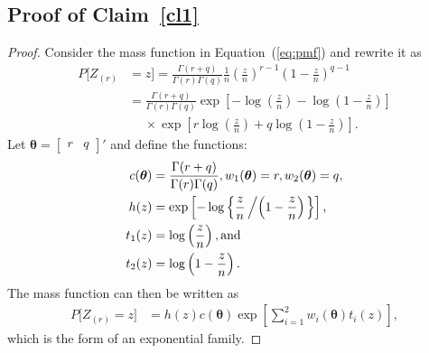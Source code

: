 \documentclass[12pt]{article}
\theoremstyle{plain}
\newcommand{\btheta}{\boldsymbol{\theta}}
\begin{document}
\begin{appendix}
\section{Proof of Claim~\ref{cl1}}\label{appB}


\begin{proof}
Consider the mass function in Equation~(\ref{eq:pmf}) and rewrite it as
\begin{align*}
	P\bigg[ Z_{(r)} &= z \bigg]  =\frac{\Gamma(r+q)}{\Gamma(r)\Gamma(q)}  \frac{1}{n} \left(\frac{z}{n}\right)^{r-1}\left(1-\frac{z}{n}\right)^{q-1} \\
	&= \frac{\Gamma(r+q)}{\Gamma(r)\Gamma(q)}\exp\left[ - \log\left( \frac{z}{n} \right) - \log\left(1-\frac{z}{n}\right)  \right]\\
	&\hspace{15pt}\times \exp\left[ r\log\left( \frac{z}{n} \right) + q\log\left(1-\frac{z}{n}\right) \right].
\end{align*}
Let $\btheta = [\begin{array}{cc} r & q \end{array}]'$ and define the functions: 
\begin{align*}
	c(\btheta) &= \frac{\Gamma(r+q)}{\Gamma(r)\Gamma(q)}, w_1(\btheta) = r, w_2(\btheta) = q,\\
	h(z) &= \exp\left[ - \log\left\{ \frac{z}{n}\left/ \left(1-\frac{z}{n}\right)\right.\right\}  \right],\\
	 t_1(z) &= \log\left( \frac{z}{n} \right), \text{and }\\
	t_2(z) &= \log\left(1-\frac{z}{n}\right).
\end{align*} 
The mass function can then be written as
\begin{align*}
	P\bigg[ Z_{(r)} = z \bigg]  &= h(z)c(\btheta)\exp\left[ \sum_{i=1}^2 w_i(\btheta)t_i(z) \right],
\end{align*}
which is the form of an exponential family. 
\end{proof}

\end{appendix}

\end{document}
